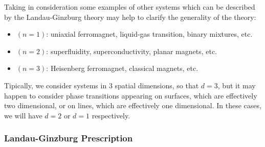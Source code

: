 \begin{example}
    Taking in consideration some examples of other systems which can be described by the Landau-Ginzburg theory may help to clarify the generality of the theory:
    \begin{itemize}
        \item \((n=1)\): uniaxial ferromagnet, liquid-gas transition, binary mixtures, etc.
        \item \((n=2)\): superfluidity, superconductivity, planar magnets, etc.
        \item \((n=3)\): Heisenberg ferromagnet, classical magnets, etc.
    \end{itemize}
    Tipically, we consider systems in 3 spatial dimensions, so that \(d=3\), but it may happen to consider phase transitions appearing on surfaces, which are effectively two dimensional, or on lines, which are effectively one dimensional. In these cases, we will have \(d=2\) or \(d=1\) respectively.
\end{example}

\subsubsection{Landau-Ginzburg Prescription}

